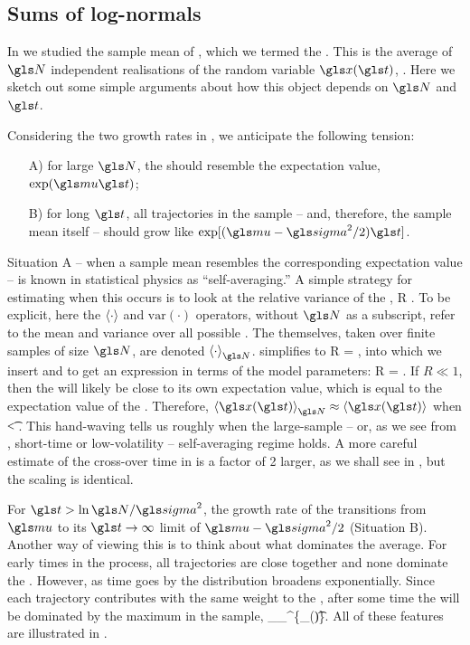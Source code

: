 \subsection{Sums of log-normals}
In \cite{PetersKlein2013} we studied the sample mean of \GBM, which we termed the \PEA. This is the average of $\N$ independent realisations of the random variable $\x(\t)$, . Here we sketch out some simple arguments about how this object depends on $\N$ and $\t$.

Considering the two growth rates in , we anticipate the following tension:
\begin{enumerate}
\item[A)] for large $\N$, the \PEA should resemble the expectation value, $\exp(\gmu \t)$;
\item[B)] for long $\t$, all trajectories in the sample -- and, therefore, the sample mean itself -- should grow like $\exp[(\gmu-\gsigma^2/2)\t]$.
\end{enumerate}
Situation A -- when a sample mean resembles the corresponding expectation value -- is known in statistical physics as ``self-averaging.'' A simple strategy for estimating when this occurs is to look at the relative variance of the \PEA,
\be
R \equiv {}.
\ee
To be explicit, here the $\left\langle\cdot\right\rangle$ and $\text{var}(\cdot)$ operators, 
without $\N$ as a subscript, 
refer to the mean and variance over all possible \PEAs. The \PEAs themselves, taken over finite samples of size $\N$, are denoted $\ave{\cdot}_\N$.  simplifies to
\be
R = ,
\ee
into which we insert  and  to get an expression in terms of the \GBM model parameters:
\be
R = .
\ee
If $R \ll 1$, then the \PEA will likely be close to its own expectation value, which is equal to the expectation value of the \GBM. Therefore, $\ave{\x(\t)}_\N\approx\ave{\x(\t)}$ when
\be
\t < .
\ee
This hand-waving tells us roughly when the large-sample -- or, as we see from , short-time or low-volatility -- self-averaging regime holds. A more careful estimate of the cross-over time in  is a factor of 2 larger, as we shall see in , but the scaling is identical.

For $\t>\ln \N/\gsigma^2$, the growth rate of the \PEA transitions from $\gmu$ to its $\t\to\infty$ limit of $\gmu-\gsigma^2/2$ (Situation B). 
Another way of viewing this is to think about what dominates the average. For early times in the process, all trajectories are close together and none dominate the \PEA. However, as time goes by the distribution broadens exponentially. Since each trajectory contributes with the same weight to the \PEA, after some time the \PEA will be dominated by the maximum in the sample,
\be
\ave{\x(\t)}_\N \approx {}\max_{}^\N \{\x_\gi(\t)\}.
\ee
All of these features are illustrated in .

